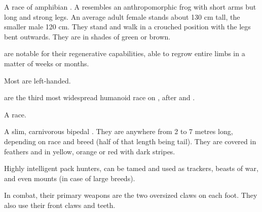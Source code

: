 \begin{gloss}
\begin{comment}
\paragraph{\meccaran}
\end{comment}
\gitem[\meccara][\meccarans]{\meccaran}
A race of amphibian . 
A \meccaran{} resembles an anthropomorphic frog with short arms but long and strong legs. 
An average adult female stands about 130 cm tall, the smaller male 120 cm. 
They stand and walk in a crouched position with the legs bent outwards. 
They are \coloured in shades of green or brown. 

\Meccara{} are notable for their regenerative capabilities, able to regrow entire limbs in a matter of weeks or months. 

Most \meccara{} are left-handed. 

\Meccara{} are the third most widespread humanoid race on \Miith{}, after  and . 








\begin{comment}
\paragraph{\nephil}
\end{comment}
\gitem[\nephilim]{\nephil}
A  race.








\begin{comment}
\paragraph{\nycan}
\end{comment}
\gitem{\nycan}
A slim, carnivorous bipedal . 
They are anywhere from 2 to 7 metres long, depending on race and breed (half of that length being tail).
They are covered in feathers and \coloured in yellow, orange or red with dark stripes. 

Highly intelligent pack hunters, \nycans{} can be tamed and used as trackers, beasts of war, and even mounts (in case of large breeds).

In combat, their primary weapons are the two oversized claws on each foot. 
They also use their front claws and teeth. 


\end{gloss}
